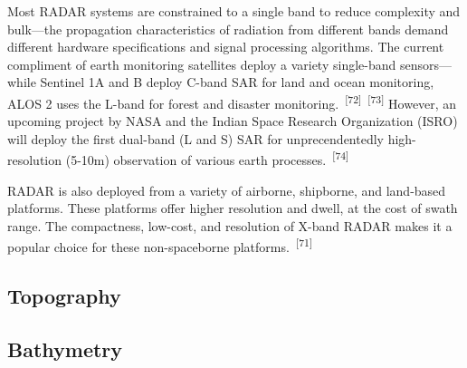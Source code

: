 \documentclass{article}
\begin{document}
\par{Most RADAR systems are constrained to a single band to reduce complexity and bulk---the propagation characteristics of radiation from different bands demand different hardware specifications and signal processing algorithms. The current compliment of earth monitoring satellites deploy a variety single-band sensors---while Sentinel 1A and B deploy C-band SAR for land and ocean monitoring, ALOS 2 uses the L-band for forest and disaster monitoring.~\textsuperscript{[72]}~\textsuperscript{[73]} However, an upcoming project by NASA and the Indian Space Research Organization (ISRO) will deploy the first dual-band (L and S) SAR for unprecendentedly high-resolution (5-10m) observation of various earth processes.~\textsuperscript{[74]}


\par{RADAR is also deployed from a variety of airborne, shipborne, and land-based platforms. These platforms offer higher resolution and dwell, at the cost of swath range. The compactness, low-cost, and resolution of X-band RADAR makes it a popular choice for these non-spaceborne platforms.~\textsuperscript{[71]}}








\newpage %
\subsection{Topography}



\subsection{Bathymetry}


}
\end{document}
